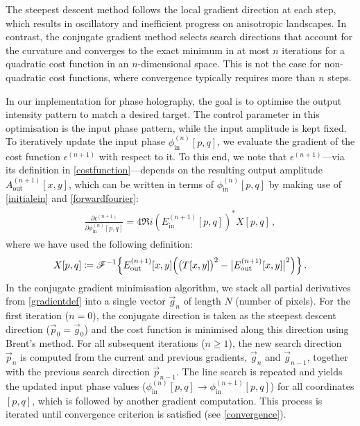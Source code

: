 \documentclass[../Thesis-IJspeert.tex]{subfiles}
\begin{document}
The steepest descent method follows the local gradient direction at each step, which results in oscillatory and inefficient progress on anisotropic landscapes. In contrast, the conjugate gradient method selects search directions that account for the curvature and converges to the exact minimum in at most $ n $ iterations for a quadratic cost function in an $ n $-dimensional space. This is not the case for non-quadratic cost functions, where convergence typically requires more than $n$ steps.

In our implementation for phase holography, the goal is to optimise the output intensity pattern to match a desired target. The control parameter in this optimisation is the input phase pattern, while the input amplitude is kept fixed. To iteratively update the input phase $\phi_\mathrm{in}^{(n)}[p,q]$, we evaluate the gradient of the cost function $\epsilon^{(n+1)}$ with respect to it. To this end, we note that $\epsilon^{(n+1)}$---via its definition in \autoref{costfunction}---depends on the resulting output amplitude $A_\mathrm{out}^{(n+1)}[x,y]$, which can be written in terms of $\phi_\mathrm{in}^{(n)}[p,q]$ by making use of \autoref{initialein} and \autoref{forwardfourier}:
\begin{align}
\label{gradientdef}
\begin{split}
\frac{\partial \epsilon^{(n+1)}}{\partial \phi_\mathrm{in}^{(n)}[p,q]} = 4\Re {i \left(E_\mathrm{in}^{(n+1)}[p,q]\right)^{\!*} X[p,q] } \,,
\end{split}
\end{align}
where we have used the following definition:
\begin{equation}
X[p,q]\coloneqq \mathcal{F}^{-1}\Bigl\{  E_\mathrm{out}^{(n+1)} [x,y] \left( \big(T[x,y]\big)^2 - \big\lvert  E_\mathrm{out}^{(n+1)}[x,y] \big\rvert^2 \right)\Bigr\} \,.
\end{equation}
In the conjugate gradient minimisation algorithm, we stack all partial derivatives from \autoref{gradientdef} into a single vector $\vec{g}_n$ of length $N$ (number of pixels). For the first iteration ($n = 0$), the conjugate direction is taken as the steepest descent direction ($\vec{p}_0 = \vec{g}_0$) and the cost function is minimised along this direction using Brent’s method. For all subsequent iterations ($n \geq 1$), the new search direction $\vec{p}_n$ is computed from the current and previous gradients, $\vec{g}_n$ and $\vec{g}_{n-1}$, together with the previous search direction $\vec{p}_{n-1}$. The line search is repeated and yields the updated input phase values ($\phi_\mathrm{in}^{(n)}[p,q] \rightarrow \phi_\mathrm{in}^{(n+1)}[p,q]$) for all coordinates $[p,q]$, which is followed by another gradient computation. This process is iterated until convergence criterion is satisfied (see \autoref{convergence}).
\end{document}
